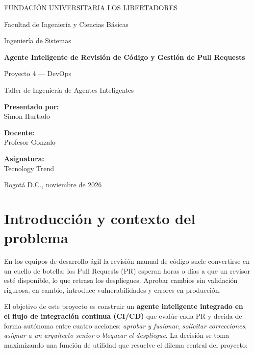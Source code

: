 \documentclass[11pt,a4paper]{article}
\begin{document}
\sloppy

\begin{titlepage}
\centering
{\large FUNDACIÓN UNIVERSITARIA LOS LIBERTADORES\par}
{\large Facultad de Ingeniería y Ciencias Básicas\par}
{\large Ingeniería de Sistemas\par}
\vspace{3cm}
{\Huge\bfseries Agente Inteligente de Revisión de Código y Gestión de Pull Requests\par}
\vspace{0.6cm}
{\Large Proyecto 4 --- DevOps\par}
\vspace{0.4cm}
{\large Taller de Ingeniería de Agentes Inteligentes\par}
\vspace{3cm}
{\large\textbf{Presentado por:}\\ Simon Hurtado\par}
\vspace{0.8cm}
{\large\textbf{Docente:}\\ Profesor Gonzalo\par}
\vspace{0.8cm}
{\large\textbf{Asignatura:}\\ Tecnology Trend\par}
\vfill
{\large Bogotá D.C., noviembre de 2026\par}
\end{titlepage}

\tableofcontents
\newpage

\section{Introducción y contexto del problema}

En los equipos de desarrollo ágil la revisión manual de código suele convertirse en un cuello de
botella: los Pull Requests (PR) esperan horas o días a que un revisor esté disponible, lo que retrasa
los despliegues. Aprobar cambios sin validación rigurosa, en cambio, introduce vulnerabilidades y
errores en producción.

El objetivo de este proyecto es construir un \textbf{agente inteligente integrado en el flujo de
integración continua (CI/CD)} que evalúe cada PR y decida de forma autónoma entre cuatro acciones:
\textit{aprobar y fusionar}, \textit{solicitar correcciones}, \textit{asignar a un arquitecto senior}
o \textit{bloquear el despliegue}. La decisión se toma maximizando una función de utilidad que
resuelve el dilema central del proyecto:
\end{document}
